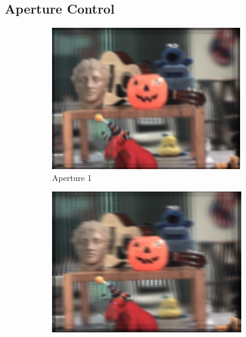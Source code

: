 \documentclass{article}
\begin{document}
\subsection{Aperture Control}
\begin{figure}[htbp]
    \begin{subfigure}[b]{0.24\textwidth} %
        \centering
        \includegraphics[width=\textwidth]{ap=0.png} %
        \caption{Aperture 1} %
    \end{subfigure}
    \hfill
    \begin{subfigure}[b]{0.24\textwidth} %
        \centering
        \includegraphics[width=\textwidth]{f12.png} %

\end{subfigure}
\end{figure}
\end{document}
